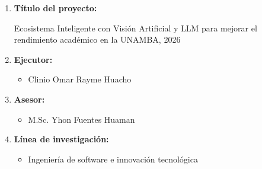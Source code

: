 \begin{enumerate}[label=\alph*)]
    \item \textbf{Título del proyecto:}

    Ecosistema Inteligente con Visión Artificial y LLM para mejorar el rendimiento académico en la UNAMBA, 2026\\
	
    \item \textbf{Ejecutor:}
    \begin{itemize}[label=\textbullet, leftmargin=0.55cm]
        \item Clinio Omar Rayme Huacho \\
    \end{itemize} %
    
    \item \textbf{Asesor:}
    \begin{itemize}[label=\textbullet, leftmargin=0.55cm]
        \item M.Sc. Yhon Fuentes Huaman \\
    \end{itemize} %
    
    \item \textbf{Línea de investigación:}
    \begin{itemize}[label=\textbullet, leftmargin=0.55cm]
        \item Ingeniería de software e innovación tecnológica \\
    \end{itemize} %
   
\end{enumerate}
